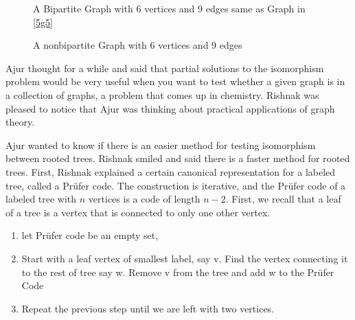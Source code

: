 \begin{figure}

\caption{ A Bipartite Graph with 6 vertices and 9 edges same as Graph in \ref{5g5}}\label{8g3}

\end{figure}

\begin{figure}

\caption{ A nonbipartite Graph with 6 vertices and 9 edges}\label{8g4}

\end{figure}

Ajur thought for a while and said that partial solutions to the isomorphism problem would be very useful when you want to test whether a given graph is in a collection of graphs, a problem that comes up in chemistry. Rishnak was pleased to notice that Ajur was thinking about practical applications of graph theory. 

Ajur wanted to know if there is an easier method for testing isomorphism between rooted trees. Rishnak smiled and said there is a faster method for rooted trees. First, Rishnak explained a certain canonical representation for a labeled tree, called a Pr\"ufer code. The construction is iterative, and the Pr\"ufer code of a labeled tree with $n$ vertices is a code of length $n-2$. First, we recall that a leaf of a tree is a vertex that is connected to only one other vertex.

\begin{enumerate}
\item let Pr{\"u}fer code be an empty set,

\item Start with a leaf vertex of smallest label, say v. Find the vertex connecting it to the rest of tree say w.  Remove v from the tree and add w to the Pr{\"u}fer Code
 
\item Repeat the previous step until we are left with two vertices.
\end{enumerate}

